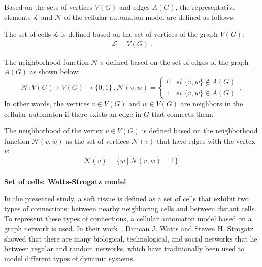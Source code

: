 \documentclass[a4paper,11pt]{article}
\begin{document}
{Based on the sets of vertices $V(G)$ and edges $A(G)$, the representative elements $\mathcal{L}$ and $\mathcal{N}$ of the cellular automaton model are defined as follows:

The set of cells $\mathcal{L}$ is defined based on the set of vertices of the graph $V(G)$:
\begin{align}
\boxed{\mathcal{L} = V(G)}~. \label{eq-L}
\end{align}

The neighborhood function $\mathcal{N}$ s defined based on the set of edges of the graph $A(G)$ as shown below:
\begin{subequations}
\begin{equation}
\boxed{\mathcal{N} : V(G) \times V(G) \rightarrow \lbrace 0,1 \rbrace}~, \label{eq-N}
\end{equation}
\begin{equation}
\boxed{\mathcal{N}(v,w) = \left\lbrace
	\begin{array}{lr}
		0& \textit{si } \lbrace v,w \rbrace \notin A(G)\\
		1& \textit{si } \lbrace v,w \rbrace \in A(G)
	\end{array}
\right.}~, \label{eq-N-2}
\end{equation}
\end{subequations}
In other words, the vertices $v \in V(G)$ and $w \in V(G)$  are neighbors in the cellular automaton if there exists an edge in $G$ that connects them.

The neighborhood of the vertex $v \in V(G)$ is defined based on the neighborhood function $\mathcal{N}(v,w)$   as the set of vertices $\mathcal{N}(v)$  that have edges with the vertex $v$:
\begin{align} 
\mathcal{N}(v) = \lbrace w~|~\mathcal{N}(v,w)=1 \rbrace. \label{eq-neighbourhood}
\end{align}
\\
\textbf{Set of cells: Watts-Strogatz model}

In the presented study, a soft tissue is defined as a set of cells that exhibit two types of connections: between nearby neighboring cells and between distant cells. To represent these types of connections, a cellular automaton model based on a graph network is used. In their work~\cite{9}, Duncan J. Watts and Steven H. Strogatz showed that there are many biological, technological, and social networks that lie between regular and random networks, which have traditionally been used to model different types of dynamic systems.

}
\end{document}
